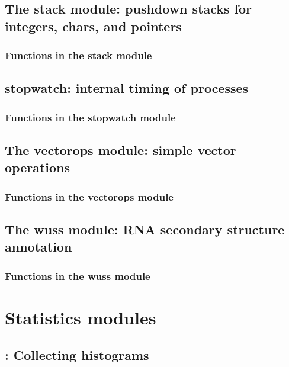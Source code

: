 \documentclass[11pt]{book}
\begin{document}
\newpage
\section{The stack module: pushdown stacks for integers, chars, and pointers}

\subsection{Functions in the stack module}


\newpage
\section{stopwatch: internal timing of processes}

\subsection{Functions in the stopwatch module}


\newpage
\section{The vectorops module: simple vector operations}

\subsection{Functions in the vectorops module}


\newpage
\section{The wuss module: RNA secondary structure annotation}

\subsection{Functions in the wuss module}



\newpage
\chapter{Statistics modules}


\newpage
\section{: Collecting histograms}

\end{document}
